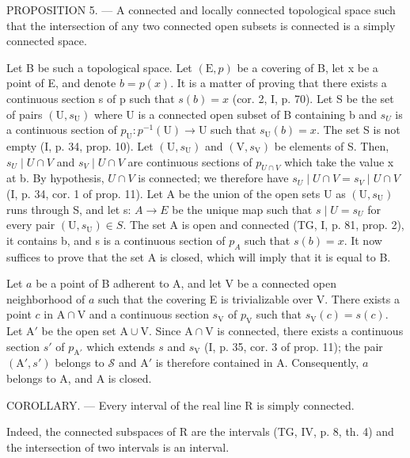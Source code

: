 PROPOSITION 5. --- A connected and locally connected topological space such that the intersection of any two connected open subsets is connected is a simply connected space.

Let B be such a topological space. Let \((\mathrm{E}, p)\) be a covering of B, let x be a point of E, and denote \(b = p(x)\). It is a matter of proving that there exists a continuous section s of p such that \(s(b) = x\) (cor. 2, I, p. 70). Let S be the set of pairs \((\mathrm{U}, s_{\mathrm{U}})\) where U is a connected open subset of B containing b and \(s_{U}\) is a continuous section of \(p_{\mathrm{U}}: p^{-1}(\mathrm{U}) \to \mathrm{U}\) such that \(s_{\mathrm{U}}(b) = x\). The set S is not empty (I, p. 34, prop. 10). Let \((\mathrm{U}, s_{\mathrm{U}})\) and \((\mathrm{V}, s_{\mathrm{V}})\) be elements of S. Then, \(s_{U} \mid U \cap V\) and \(s_{V} \mid U \cap V\) are continuous sections of \(p_{U \cap V}\) which take the value x at b. By hypothesis, \(U \cap V\) is connected; we therefore have \(s_{U} \mid U \cap V = s_{V} \mid U \cap V\) (I, p. 34, cor. 1 of prop. 11). Let A be the union of the open sets U as \((\mathrm{U}, s_{\mathrm{U}})\) runs through S, and let s: \(A \to E\) be the unique map such that \(s \mid U = s_{U}\) for every pair \((\mathrm{U}, s_{\mathrm{U}}) \in S\). The set A is open and connected (TG, I, p. 81, prop. 2), it contains b, and s is a continuous section of \(p_{A}\) such that \(s(b) = x\). It now suffices to prove that the set A is closed, which will imply that it is equal to B.

Let \(a\) be a point of B adherent to A, and let V be a connected open neighborhood of \(a\) such that the covering E is trivializable over V. There exists a point \(c\) in \(\mathrm{A} \cap \mathrm{V}\) and a continuous section \(s_{\mathrm{V}}\) of \(p_{\mathrm{V}}\) such that \(s_{\mathrm{V}}(c) = s(c)\). Let \(\mathrm{A}'\) be the open set \(\mathrm{A} \cup \mathrm{V}\). Since \(\mathrm{A} \cap \mathrm{V}\) is connected, there exists a continuous section \(s'\) of \(p_{\mathrm{A}'}\) which extends \(s\) and \(s_{\mathrm{V}}\) (I, p. 35, cor. 3 of prop. 11); the pair \((\mathrm{A}', s')\) belongs to \(\mathcal{S}\) and \(\mathrm{A}'\) is therefore contained in A. Consequently, \(a\) belongs to A, and A is closed.

COROLLARY. --- Every interval of the real line R is simply connected.

Indeed, the connected subspaces of R are the intervals (TG, IV, p. 8, th. 4) and the intersection of two intervals is an interval.

